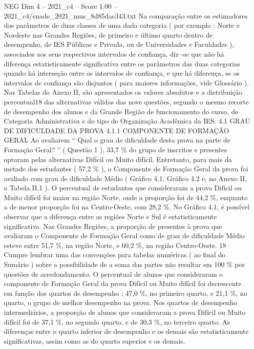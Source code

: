 \begin{textsample}{NEG Dim 4 – 2021\_c4 – Score 1.00 – 2021\_c4/enade\_2021\_mus\_8d85dac343.txt}
Na comparação entre os estimadores dos parâmetros de duas classes de uma dada categoria ( por exemplo : Norte e Nordeste nas Grandes Regiões, de primeiro e último quarto dentro de desempenho, de IES Públicas e Privada, ou de Universidades e Faculdades ), associados aos seus respectivos intervalos de confiança, diz -se que não há diferença estatisticamente significativa entre os parâmetros das duas categorias quando há interseção entre os intervalos de confiança, e que há diferença, se os intervalos de confiança são disjuntos ( para maiores informações, vide Glossário ).
Nas Tabelas do Anexo II, são apresentados os valores absolutos e a distribuição percentual18 das alternativas válidas das nove questões, segundo o mesmo recorte de desempenho dos alunos e da Grande Região de funcionamento do curso, de Categoria Administrativa e do tipo de Organização Acadêmica da IES. 4.1 GRAU DE DIFICULDADE DA PROVA 4.1.1 COMPONENTE DE FORMAÇÃO GERAL Ao avaliarem “ Qual o grau de dificuldade desta prova na parte de Formação Geral? ” ( Questão 1 ), 33,7 \% do grupo de inscritos e presentes optaram pelas alternativas Difícil ou Muito difícil.
Entretanto, para mais da metade dos estudantes ( 57,2 \% ), o Componente de Formação Geral da prova foi avaliado com grau de dificuldade Médio ( Gráfico 4.1, Gráfico 4.2 e, no Anexo II, a Tabela II.1 ).
O percentual de estudantes que consideraram a prova Difícil ou Muito difícil foi maior na região Norte, onde a proporção foi de 44,2 \%, enquanto a de menor proporção foi na Centro-Oeste, com 28,2 \%.
No Gráfico 4.1, é possível observar que a diferença entre as regiões Norte e Sul é estatisticamente significativa.
Nas Grandes Regiões, a proporção de presentes à prova que avaliaram o Componente de Formação Geral como de grau de dificuldade Médio esteve entre 51,7 \%, na região Norte, e 60,2 \%, na região Centro-Oeste. 18 Cumpre lembrar uma das convenções para tabelas numéricas ( ao final do Sumário ) sobre a possibilidade de a soma das partes não resultar em 100 \% por questões de arredondamento.
O percentual de alunos que consideraram o componente de Formação Geral da prova Difícil ou Muito difícil foi decrescente em função dos quartos de desempenho : 47,0 \%, no primeiro quarto, e 21,1 \%, no quarto, o grupo de melhor desempenho na prova.
Nos quartos de desempenho intermediários, a proporção de alunos que consideraram a prova Difícil ou Muito difícil foi de 37,1 \%, no segundo quarto, e de 30,3 \%, no terceiro quarto.
As diferenças entre o quarto inferior de desempenho e os demais são estatisticamente significativas, assim como as do quarto superior e os demais.

\end{textsample}
